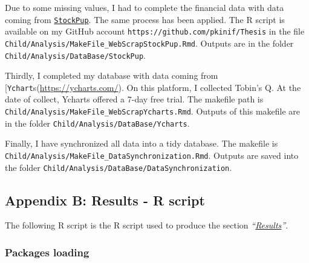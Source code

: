 \documentclass[12pt,]{article}
\begin{document}
Due to some missing values, I had to complete the financial data with
data coming from \href{http://www.stockpup.com/}{\texttt{StockPup}}. The
same process has been applied. The R script is available on my GitHub
account \texttt{https://github.com/pkinif/Thesis} in the file
\texttt{Child/Analysis/MakeFile\_WebScrapStockPup.Rmd}. Outputs are in
the folder \texttt{Child/Analysis/DataBase/StockPup}.

Thirdly, I completed my database with data coming from
{[}\texttt{Ychart}s(\url{https://ycharts.com/}). On this platform, I
collected Tobin's Q. At the date of collect, Ycharts offered a 7-day
free trial. The makefile path is
\texttt{Child/Analysis/MakeFile\_WebScrapYcharts.Rmd}. Outputs of this
makefile are in the folder \texttt{Child/Analysis/DataBase/Ycharts}.

Finally, I have synchronized all data into a tidy database. The makefile
is \texttt{Child/Analysis/MakeFile\_DataSynchronization.Rmd}. Outputs
are saved into the folder
\texttt{Child/Analysis/DataBase/DataSynchronization}. \newpage

\hypertarget{appendix-b-results---r-script}{\subsection*{Appendix B:
Results - R script}\label{appendix-b-results---r-script}}

The following R script is the R script used to produce the section
\emph{``\protect\hyperlink{results}{Results}''}.

\subsubsection*{Packages loading}\label{packages-loading}
\end{document}
